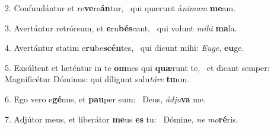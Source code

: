 2. Confundántur et re\textbf{ve}re\textbf{án}tur, \ast\  qui quærunt á\textit{ni}\textit{mam} \textbf{me}am.\

3. Avertántur retrórsum, et \textbf{e}ru\textbf{bés}cant, \ast\  qui volunt \textit{mi}\textit{hi} \textbf{ma}la.\

4. Avertántur statim e\textbf{ru}be\textbf{scén}tes, \ast\  qui dicunt mihi: \textit{Eu}\textit{ge}, \textbf{eu}ge.\

5. Exsúltent et læténtur in te \textbf{om}nes qui \textbf{quæ}runt te, \ast\  et dicant semper: Magnificétur Dóminus: qui díligunt salu\textit{tá}\textit{re} \textbf{tu}um.\

6. Ego vero e\textbf{gé}nus, et \textbf{pau}per sum: \ast\  Deus, \textit{ád}\textit{ju}\textbf{va} me.\

7. Adjútor meus, et liberátor \textbf{me}us \textbf{es} tu: \ast\  Dómine, \textit{ne} \textit{mo}\textbf{ré}ris.\

